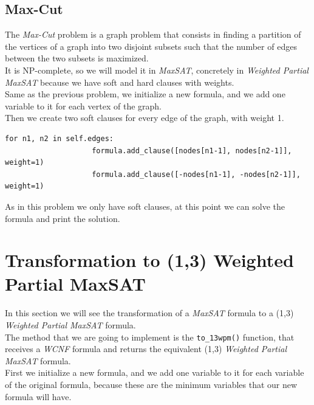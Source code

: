 \documentclass[11pt]{article}
\begin{document}
        \subsection{Max-Cut}
        \label{subsec:maxcut}
            The \textit{Max-Cut} problem is a graph problem that consists in finding a partition of the vertices of a graph into two disjoint subsets such that the number of edges between the two subsets is maximized.\\
            It is NP-complete, so we will model it in \textit{MaxSAT}, concretely in \textit{Weighted Partial MaxSAT} because we have soft and hard clauses with weights.\\
            Same as the previous problem, we initialize a new formula, and we add one variable to it for each vertex of the graph.\\
            Then we create two soft clauses for every edge of the graph, with weight 1.
            \begin{lstlisting}[label={lst:lstlisting5}]
                for n1, n2 in self.edges:
                    formula.add_clause([nodes[n1-1], nodes[n2-1]], weight=1)
                    formula.add_clause([-nodes[n1-1], -nodes[n2-1]], weight=1)
            \end{lstlisting}
            As in this problem we only have soft clauses, at this point we can solve the formula and print the solution.\\

    \section{Transformation to (1,3) Weighted Partial MaxSAT}
    \label{sec:transformation}
        In this section we will see the transformation of a \textit{MaxSAT} formula to a (1,3) \textit{Weighted Partial MaxSAT} formula.\\
        The method that we are going to implement is the \verb|to_13wpm()| function, that receives a \textit{WCNF} formula and returns the equivalent (1,3) \textit{Weighted Partial MaxSAT} formula.\\
        First we initialize a new formula, and we add one variable to it for each variable of the original formula, because these are the minimum variables that our new formula will have.\\
\end{document}
